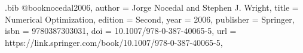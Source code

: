 


\begin{filecontents}[overwrite]{\jobname.bib}
@book{nocedal2006,
  author    = {Jorge Nocedal and Stephen J. Wright},
  title     = {Numerical Optimization},
  edition   = {Second},
  year      = {2006},
  publisher = {Springer},
  isbn      = {9780387303031},
  doi       = {10.1007/978-0-387-40065-5},
  url       = {https://link.springer.com/book/10.1007/978-0-387-40065-5},
}
\end{filecontents}


\documentclass[9pt, headings=standardclasses, parskip=half]{scrartcl}
\usepackage{ifthen}
\usepackage{iftex}
\usepackage{csquotes}


\usepackage[automark]{scrlayer-scrpage}
\clearpairofpagestyles
\ofoot{\pagemark} %


\usepackage{graphicx}
\usepackage[dvipsnames]{xcolor}
\usepackage{soul}

\usepackage[left=30mm, right=30mm, top=20mm, bottom=30mm]{geometry}

\usepackage{amsmath, amssymb, amsthm}
\usepackage{mathtools}
\usepackage{mathdots} %
\DeclareMathOperator*{\argmax}{arg\,max}
\DeclareMathOperator*{\argmin}{arg\,min}

\usepackage{enumitem}
\renewcommand{\labelitemi}{\textbullet}
\renewcommand{\labelitemii}{\raisebox{0.1ex}{\scalebox{0.8}{\textbullet}}}
\renewcommand{\labelitemiii}{\raisebox{0.2ex}{\scalebox{0.6}{\textbullet}}}
\renewcommand{\labelitemiv}{\raisebox{0.3ex}{\scalebox{0.4}{\textbullet}}}

\usepackage{caption, subcaption}

\usepackage[backend=biber,style=numeric]{biblatex}


